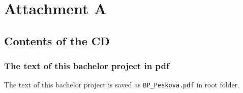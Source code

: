 \chapter*{Attachment A}

\section*{Contents of the CD}

\subsection*{The text of this bachelor project in pdf}
The text of this bachelor project is saved as \verb-BP_Peskova.pdf- in root folder. 
